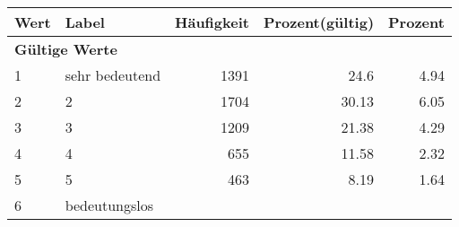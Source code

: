      \begin{longtable}{lXrrr}
     \toprule
     \textbf{Wert} & \textbf{Label} & \textbf{Häufigkeit} & \textbf{Prozent(gültig)} & \textbf{Prozent} \\
     \endhead
     \midrule
     \multicolumn{5}{l}{\textbf{Gültige Werte}}\\

     1 &
     \multicolumn{1}{X}{ sehr bedeutend   } &


       \num{1391} &
       \num[round-mode=places,round-precision=2]{24,6} &
         \num[round-mode=places,round-precision=2]{4,94} \\

     2 &
     \multicolumn{1}{X}{ 2   } &


       \num{1704} &
       \num[round-mode=places,round-precision=2]{30,13} &
         \num[round-mode=places,round-precision=2]{6,05} \\

     3 &
     \multicolumn{1}{X}{ 3   } &


       \num{1209} &
       \num[round-mode=places,round-precision=2]{21,38} &
         \num[round-mode=places,round-precision=2]{4,29} \\

     4 &
     \multicolumn{1}{X}{ 4   } &


       \num{655} &
       \num[round-mode=places,round-precision=2]{11,58} &
         \num[round-mode=places,round-precision=2]{2,32} \\

     5 &
     \multicolumn{1}{X}{ 5   } &


       \num{463} &
       \num[round-mode=places,round-precision=2]{8,19} &
         \num[round-mode=places,round-precision=2]{1,64} \\

     6 &
     \multicolumn{1}{X}{ bedeutungslos   } &



\end{longtable}
